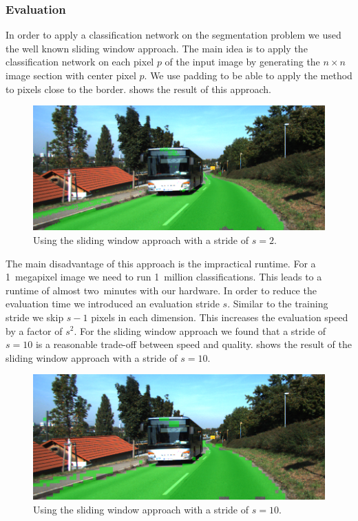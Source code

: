 \subsubsection{Evaluation}
In order to apply a classification network on the segmentation problem we used
the well known sliding window approach. The main idea is to apply the
classification network on each pixel $p$ of the input image by generating the
$n \times n$ image section with center pixel $p$. We use padding to be able to
apply the method to pixels close to the border.  shows the
result of this approach.

\begin{figure}[H]
    \centering
    \includegraphics[width=\columnwidth]{figures/models/testing2-um_32_sliding_stride2.png}
    \caption{Using the sliding window approach with a stride of $s=2$.}%
\label{fig:stride2}
\end{figure}

The main disadvantage of this approach is the impractical runtime. For a
1~megapixel image we need to run 1~million classifications. This leads to a
runtime of almost two~minutes with our hardware. In order to reduce the
evaluation time we introduced an evaluation stride $s$. Similar to the training
stride we skip $s-1$ pixels in each dimension. This increases the evaluation
speed by a factor of $s^2$. For the sliding window approach we found that a
stride of $s = 10$ is a reasonable trade-off between speed and quality.
 shows the result of the sliding window approach with a
stride of $s=10$.



\begin{figure}[H]
    \centering
    \includegraphics[width=\columnwidth]{figures/models/testing2-um_32_sliding_stride10.png}
    \caption{Using the sliding window approach with a stride of $s=10$.}%
\label{fig:stride10}
\end{figure}


